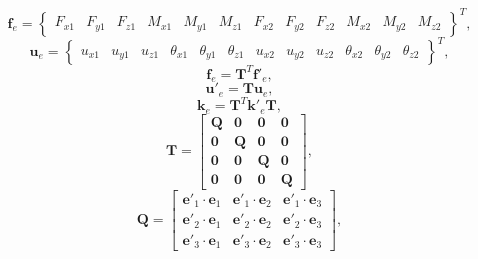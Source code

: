 \documentclass[12pt,a4paper,article]{memoir} %
\begin{document}
\begin{equation}
  \mathbf{f}_e = \left\{ \begin{array}{cccccccccccc} F_{x1} & F_{y1} & F_{z1} & M_{x1} & M_{y1} & M_{z1} & F_{x2} & F_{y2} & F_{z2} & M_{x2} & M_{y2} & M_{z2} \end{array} \right\}^T,
\end{equation}
\begin{equation}
\mathbf{u}_e = \left\{ \begin{array}{cccccccccccc} u_{x1} & u_{y1} & u_{z1} & \theta_{x1} & \theta_{y1} & \theta_{z1} & u_{x2} & u_{y2} & u_{z2} & \theta_{x2} & \theta_{y2} & \theta_{z2} \end{array} \right\}^T,
\end{equation}
\begin{equation}
  \mathbf{f}_e = \mathbf{T}^T \mathbf{f}'_e,
\end{equation}
\begin{equation}
  \mathbf{u}'_e = \mathbf{T} \mathbf{u}_e,
\end{equation}
\begin{equation}
  \mathbf{k}_e = \mathbf{T}^T \mathbf{k}'_e \mathbf{T},
\end{equation}
\begin{equation}
  \mathbf{T} = \left[ \begin{array}{cccc}
      \mathbf{Q} & \mathbf{0} & \mathbf{0} & \mathbf{0} \\
      \mathbf{0} & \mathbf{Q} & \mathbf{0} & \mathbf{0} \\
      \mathbf{0} & \mathbf{0} & \mathbf{Q} & \mathbf{0} \\
      \mathbf{0} & \mathbf{0} & \mathbf{0} & \mathbf{Q} \end{array} \right],
\end{equation}
\begin{equation}
  \mathbf{Q} = \left[ \begin{array}{ccc}
      \mathbf{e}'_1 \cdot \mathbf{e}_1 & \mathbf{e}'_1 \cdot \mathbf{e}_2 & \mathbf{e}'_1 \cdot \mathbf{e}_3 \\
      \mathbf{e}'_2 \cdot \mathbf{e}_1 & \mathbf{e}'_2 \cdot \mathbf{e}_2 & \mathbf{e}'_2 \cdot \mathbf{e}_3 \\
      \mathbf{e}'_3 \cdot \mathbf{e}_1 & \mathbf{e}'_3 \cdot \mathbf{e}_2 & \mathbf{e}'_3 \cdot \mathbf{e}_3 \end{array} \right],
\end{equation}
\end{document}
